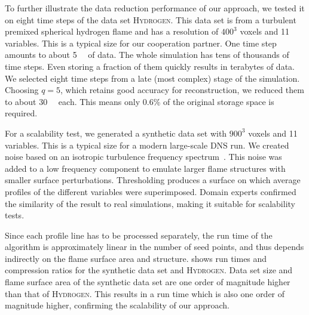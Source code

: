 %
To further illustrate the data reduction performance of our approach, we tested
it on eight time steps of the data set \textsc{Hydrogen}.
%
This data set is from a turbulent premixed spherical hydrogen flame and has a
resolution of $400^3$ voxels and 11 variables.
%
This is a typical size for our cooperation partner.
%
One time step amounts to about \SI{5}{\giga\byte} of data.
%
The whole simulation has tens of thousands of time steps.
%
Even storing a fraction of them quickly results in terabytes of data.
%
We selected eight time steps from a late (most complex) stage of the simulation.
%
Choosing $q=5$, which retains good accuracy for reconstruction, we reduced them
to about \SI{30}{\mega\byte} each.
%
This means only 0.6\% of the original storage space is required.
%

%
For a scalability test, we generated a synthetic data set with $900^3$ voxels
and 11 variables.
%
This is a typical size for a modern large-scale \ac{DNS} run.
%
We created noise based on an isotropic turbulence frequency
spectrum~\cite{Ferrante2003}.
%
This noise was added to a low frequency component to emulate larger flame
structures with smaller surface perturbations.
%
Thresholding produces a surface on which average profiles of the different
variables were superimposed.
%
Domain experts confirmed the similarity of the result to real simulations,
making it suitable for scalability tests.
%

%
Since each profile line has to be processed separately, the run time of the
algorithm is approximately linear in the number of seed points, and thus depends
indirectly on the flame surface area and structure.
%
 shows run times and compression ratios for
the synthetic data set and \textsc{Hydrogen}.
%
Data set size and flame surface area of the synthetic data set are one order
of magnitude higher than that of \textsc{Hydrogen}.
%
This results in a run time which is also one order of magnitude higher,
confirming the scalability of our approach.
%

%
%
%
